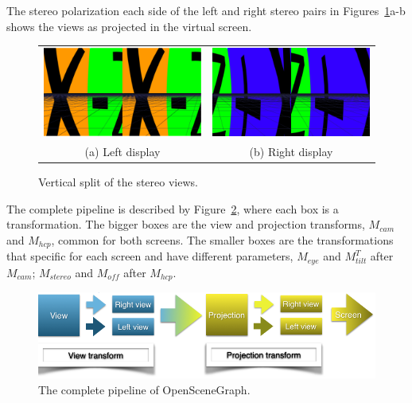 The stereo polarization each side of the left and right stereo pairs in Figures~\ref{fig.split_screens}a-b shows the views as projected in the virtual screen.

\begin{figure}[!hbt]
\centering
\begin{tabular}{cc}
\includegraphics[width=0.45\linewidth,keepaspectratio=true]{figs/left_screen.png}&
\includegraphics[width=0.45\linewidth,keepaspectratio=true]{figs/right_screen.png}\\
(a) Left display & 
(b) Right display
\end{tabular}
\caption{Vertical split of the stereo views.}
\label{fig.split_screens}
\end{figure}

The complete pipeline is described by Figure~\ref{fig.osg_pipeline}, where each box is a transformation. The bigger boxes are the view and projection transforms, $M_{cam}$ and  $M_{hcp}$, common for both screens. The smaller boxes are the transformations that specific for each screen and have different parameters, $M_{eye}$ and $M_{tilt}^{T}$ after $M_{cam}$; $M_{stereo}$ and $M_{off}$ after $M_{hcp}$.

\begin{figure}[!htb]
\centering
\includegraphics[width=0.9\linewidth,keepaspectratio=true]{figs/osg_pipeline.png}
\caption{The complete pipeline of OpenSceneGraph.}
\label{fig.osg_pipeline}
\end{figure}